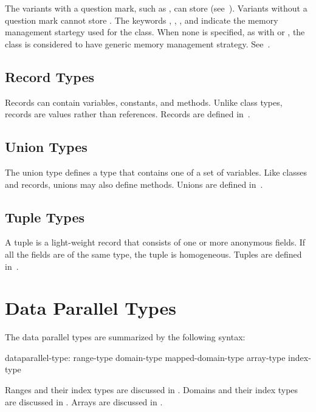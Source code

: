 The variants with a question mark, such as , can store
 (see~). Variants without a question mark
cannot store . The keywords , ,
, and  indicate the memory management
startegy used for the class. When none is specified, as with  or
, the class is considered to have generic memory management
strategy. See~.

\subsection{Record Types}
\label{Types_Record_Types}

Records can contain variables, constants, and methods. Unlike class
types, records are values rather than references. Records are defined
in~.

\subsection{Union Types}
\label{Types_Union_Types}

The union type defines a type that contains one of a set of variables.
Like classes and records, unions may also define methods.  Unions are
defined in~.

\subsection{Tuple Types}
\label{Types_Tuple_Types}

A tuple is a light-weight record that consists of one or more
anonymous fields.  If all the fields are of the same type, the tuple
is homogeneous.  Tuples are defined in~.

\clearpage
\section{Data Parallel Types}
\label{Data_Parallel_Types}

The data parallel types are summarized by the following syntax:

\begin{syntax}
dataparallel-type:
  range-type
  domain-type
  mapped-domain-type
  array-type
  index-type
\end{syntax}

Ranges and their index types are discussed in .
Domains and their index types are discussed in .
Arrays are discussed in .

